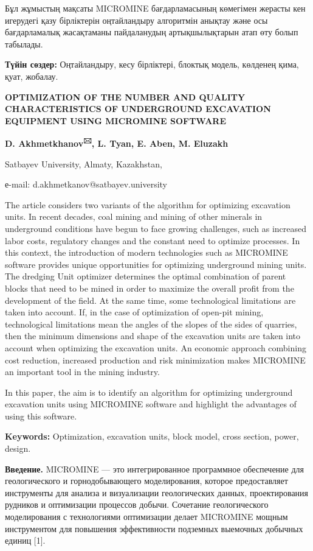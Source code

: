 Бұл жұмыстың мақсаты MICROMINE бағдарламасының көмегімен жерасты кен
игерудегі қазу бірліктерін оңтайландыру алгоритмін анықтау және осы
бағдарламалық жасақтаманы пайдаланудың артықшылықтарын атап өту болып
табылады.

{\bfseries Түйін сөздер:} Оңтайландыру, кесу бірліктері, блоктық модель,
көлденең қима, қуат, жобалау.

{\bfseries OPTIMIZATION OF THE NUMBER AND QUALITY CHARACTERISTICS OF
UNDERGROUND EXCAVATION EQUIPMENT USING MICROMINE SOFTWARE}

{\bfseries D. Akhmetkhanov\textsuperscript{🖂}, L. Tyan, E. Aben, M.
Eluzakh}

Satbayev University, Almaty, Kazakhstan,

е-mail: d.akhmetkanov@satbayev.university

The article considers two variants of the algorithm for optimizing
excavation units. In recent decades, coal mining and mining of other
minerals in underground conditions have begun to face growing
challenges, such as increased labor costs, regulatory changes and the
constant need to optimize processes. In this context, the introduction
of modern technologies such as MICROMINE software provides unique
opportunities for optimizing underground mining units. The dredging Unit
optimizer determines the optimal combination of parent blocks that need
to be mined in order to maximize the overall profit from the development
of the field. At the same time, some technological limitations are taken
into account. If, in the case of optimization of open-pit mining,
technological limitations mean the angles of the slopes of the sides of
quarries, then the minimum dimensions and shape of the excavation units
are taken into account when optimizing the excavation units. An economic
approach combining cost reduction, increased production and risk
minimization makes MICROMINE an important tool in the mining industry.

In this paper, the aim is to identify an algorithm for optimizing
underground excavation units using MICROMINE software and highlight the
advantages of using this software.

{\bfseries Keywords:} Optimization, excavation units, block model, cross
section, power, design.

{\bfseries Введение.} MICROMINE --- это интегрированное программное
обеспечение для геологического и горнодобывающего моделирования, которое
предоставляет инструменты для анализа и визуализации геологических
данных, проектирования рудников и оптимизации процессов добычи.
Сочетание геологического моделирования с технологиями оптимизации делает
MICROMINE мощным инструментом для повышения эффективности подземных
выемочных добычных единиц {[}1{]}.

